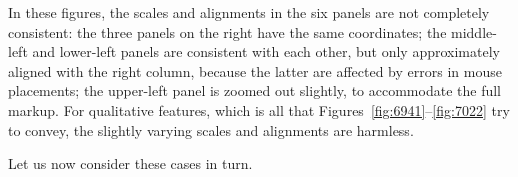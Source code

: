 \documentclass[usenatbib]{mn2e}
\begin{document}
\FloatBarrier

%
In these figures, the scales and alignments in the six panels are not
completely consistent: the three panels on the right have the same
coordinates; the middle-left and lower-left panels are consistent with
each other, but only approximately aligned with the right column,
because the latter are affected by errors in mouse placements; the
upper-left panel is zoomed out slightly, to accommodate the full
markup.  For qualitative features, which is all that
Figures~\ref{fig:6941}--\ref{fig:7022} try to convey, the slightly
varying scales and alignments are harmless.



Let us now consider these cases in turn.
\end{document}
